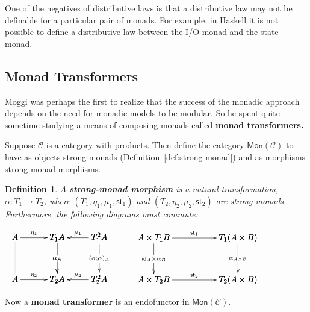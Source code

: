 \documentclass{article}
\let\mto\to
\let\to\relax
\newcommand{\to}{\rightarrow}
\newcommand{\cat}[1]{\mathcal{#1}}
\newcommand{\id}[0]{\mathsf{id}}
\newtheorem{definition}[theorem]{Definition}
\begin{document}
One of the negatives of distributive laws is that a distributive law
may not be definable for a particular pair of monads.  For example, in
Haskell it is not possible to define a distributive law between the
I/O monad and the state monad.  

\subsection{Monad Transformers}
\label{subsec:monad_transformers}

Moggi \cite{Moggi:1989a} was perhaps the first to realize that the
success of the monadic approach depends on the need for monadic models
to be modular.  So he spent quite sometime studying a means of
composing monads called \textbf{monad transformers.}

Suppose $\cat{C}$ is a category with products.  Then define the
category $\mathsf{Mon}(\cat{C})$ to have as objects strong monads
(Definition~\ref{def:strong-monad}) and as morphisms strong-monad
morphisms.

\begin{definition}
  \label{def:strong-monad-morphism}
  A \textbf{strong-monad morphism} is a natural transformation,
  $\alpha : T_1 \mto T_2$, where $(T_1,\eta_1,\mu_1,\mathsf{st}_1)$
  and $(T_2,\eta_2,\mu_2,\mathsf{st}_2)$ are strong monads.
  Furthermore, the following diagrams must commute:
  \begin{center}
    \begin{math}
      \begin{array}{cccc}
      \bfig
      \square|amma|/->`=`->`->/<500,500>[
        A`
        T_1A`
        A`
        T_2A;
        \eta_1``
        \alpha_A`
        \eta_2]
      \square(500,0)|amma|/<-`->`->`<-/<500,500>[
        T_1A`
        T^2_1A`
        T_2A`
        T^2_2A;
        \mu_1`
        \alpha_A`
        (\alpha;\alpha)_A`
        \mu_2]
      \efig
      & \quad &
      \bfig
      \square|amma|<1000,500>[
        A \times T_1B`
        T_1(A \times B)`
        A \times T_2B`
        T_2(A \times B);
        \mathsf{st}_1`
        \id_A \times \alpha_B`
        \alpha_{A \times B}`
        \mathsf{st}_2]
      \efig
    \end{array}
    \end{math}
  \end{center}
\end{definition}
\noindent
Now a \textbf{monad transformer} is an endofunctor in $\mathsf{Mon}(\cat{C})$.
\end{document}
